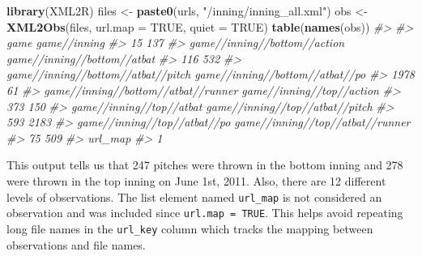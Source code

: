 \documentclass[12pt,]{isuthesis}
\newenvironment{Shaded}{\begin{snugshade}}{\end{snugshade}}
\newcommand{\KeywordTok}[1]{\textcolor[rgb]{0.13,0.29,0.53}{\textbf{{#1}}}}
\newcommand{\DataTypeTok}[1]{\textcolor[rgb]{0.13,0.29,0.53}{{#1}}}
\newcommand{\StringTok}[1]{\textcolor[rgb]{0.31,0.60,0.02}{{#1}}}
\newcommand{\CommentTok}[1]{\textcolor[rgb]{0.56,0.35,0.01}{\textit{{#1}}}}
\newcommand{\OtherTok}[1]{\textcolor[rgb]{0.56,0.35,0.01}{{#1}}}
\newcommand{\NormalTok}[1]{{#1}}
\begin{document}
\begin{Shaded}
\begin{Highlighting}[]
\KeywordTok{library}\NormalTok{(XML2R)}
\NormalTok{files <-}\StringTok{ }\KeywordTok{paste0}\NormalTok{(urls, }\StringTok{"/inning/inning_all.xml"}\NormalTok{)}
\NormalTok{obs <-}\StringTok{ }\KeywordTok{XML2Obs}\NormalTok{(files, }\DataTypeTok{url.map =} \OtherTok{TRUE}\NormalTok{, }\DataTypeTok{quiet =} \OtherTok{TRUE}\NormalTok{) }
\KeywordTok{table}\NormalTok{(}\KeywordTok{names}\NormalTok{(obs))}
\CommentTok{#> }
\CommentTok{#>                                game                        game//inning }
\CommentTok{#>                                  15                                 137 }
\CommentTok{#>        game//inning//bottom//action         game//inning//bottom//atbat }
\CommentTok{#>                                 116                                 532 }
\CommentTok{#>  game//inning//bottom//atbat//pitch     game//inning//bottom//atbat//po }
\CommentTok{#>                                1978                                  61 }
\CommentTok{#> game//inning//bottom//atbat//runner           game//inning//top//action }
\CommentTok{#>                                 373                                 150 }
\CommentTok{#>            game//inning//top//atbat     game//inning//top//atbat//pitch }
\CommentTok{#>                                 593                                2183 }
\CommentTok{#>        game//inning//top//atbat//po    game//inning//top//atbat//runner }
\CommentTok{#>                                  75                                 509 }
\CommentTok{#>                             url_map }
\CommentTok{#>                                   1}
\end{Highlighting}
\end{Shaded}

This output tells us that 247 pitches were thrown in the bottom inning
and 278 were thrown in the top inning on June 1st, 2011. Also, there are
12 different levels of observations. The list element named
\texttt{url\_map} is not considered an observation and was included
since \texttt{url.map = TRUE}. This helps avoid repeating long file
names in the \texttt{url\_key} column which tracks the mapping between
observations and file names.
\end{document}
